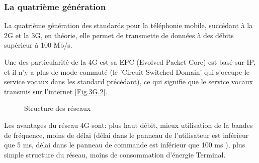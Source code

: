 \subsubsection{La quatrième génération}
La quatrième génération des standards pour la téléphonie mobile, succédant à la 2G et la 3G, en théorie, elle permet de transmette de données à des débits supérieur à 100 Mb/s. 

Une des particularité de la 4G est sa EPC (Evolved Packet Core) est basé sur IP, et il n'y a plus de mode commuté (le 'Circuit Switched Domain' qui s'occupe le service vocaux dans les standard précédant), ce qui signifie que le service vocaux transmis sur l'internet \ref{Fig.3G.2}. 



\begin{figure}[H]
	\centering
	\hfill		
	\hspace{1in}
	\caption{Structure des réseaux} 
		\label{Fig.3G}
\end{figure}
Les avantages du réseau 4G sont:  plus haut débit, mieux utilisation de la bandes de fréquence, moins de délai (délai dans le panneau de l'utilisateur est inférieur que 5 ms, délai dans le panneau de commande est inférieur que 100 ms ), plus simple structure du réseau, moins de consommation d'énergie Terminal.

